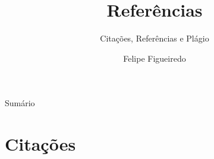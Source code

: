 \documentclass{beamer}
\title%
{Referências}
\subtitle
{Citações, Referências e Plágio} %
\author%
{Felipe Figueiredo}%
\institute[UNIAN] %
{Centro Universitário Anhanguera de Niterói - UNIAN
}
\date%
{}
\begin{document}
\begin{frame}
  \titlepage
\end{frame}

\begin{frame}{Sumário}
  \tableofcontents
\end{frame}









\section{Citações}
\end{document}
